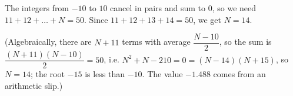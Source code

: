 The integers from $-10$ to $10$ cancel in pairs and sum to $0$, so we need $11+12+\dots+N=50$. Since $11+12+13+14=50$, we get $N=\boxed{14}$.

(Algebraically, there are $N+11$ terms with average $\dfrac{N-10}{2}$, so the sum is $\dfrac{(N+11)(N-10)}{2}=50$, i.e. $N^2+N-210=0=(N-14)(N+15)$, so $N=14$; the root $-15$ is less than $-10$. The value $-1.488$ comes from an arithmetic slip.)

